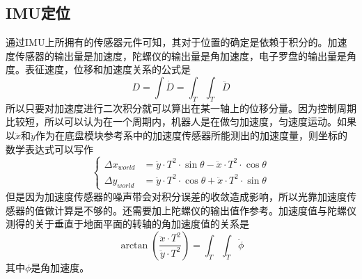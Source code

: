 \subsection{IMU定位}
通过IMU上所拥有的传感器元件可知，其对于位置的确定是依赖于积分的。加速度传感器的输出量是加速度，陀螺仪的输出量是角加速度，电子罗盘的输出量是角度。表征速度，位移和加速度关系的公式是 \\
\begin{equation}
D = \int\dot{D}=\int_T\int_T\ddot{D}
\end{equation}
所以只要对加速度进行二次积分就可以算出在某一轴上的位移分量。因为控制周期比较短，所以可以认为在一个周期内，机器人是在做匀加速度，匀速度运动。如果以$\ddot{x}$和$\ddot{y}$作为在底盘模块参考系中的加速度传感器所能测出的加速度量，则坐标的数学表达式可以写作 \\
\begin{equation}
		\left\{
             \begin{array}{lcl}
            	\Delta x_{world} &= \ddot{y}\cdot T^2\cdot \sin\theta - \ddot{x}\cdot T^2\cdot \cos\theta \\
             	\Delta y_{world} &= \ddot{y}\cdot T^2\cdot \cos\theta + \ddot{x}\cdot T^2\cdot \sin\theta  
             \end{array}  
        \right.
\end{equation}
但是因为加速度传感器的噪声带会对积分误差的收敛造成影响，所以光靠加速度传感器的值做计算是不够的。还需要加上陀螺仪的输出值作参考。加速度值与陀螺仪测得的关于垂直于地面平面的转轴的角加速度值的关系是 \\
\begin{equation}
\arctan(\frac{\ddot{x}\cdot T^2}{\ddot{y}\cdot T^2}) = \int_T\int_T \ddot{\phi}
\end{equation}
其中$\phi$是角加速度。

